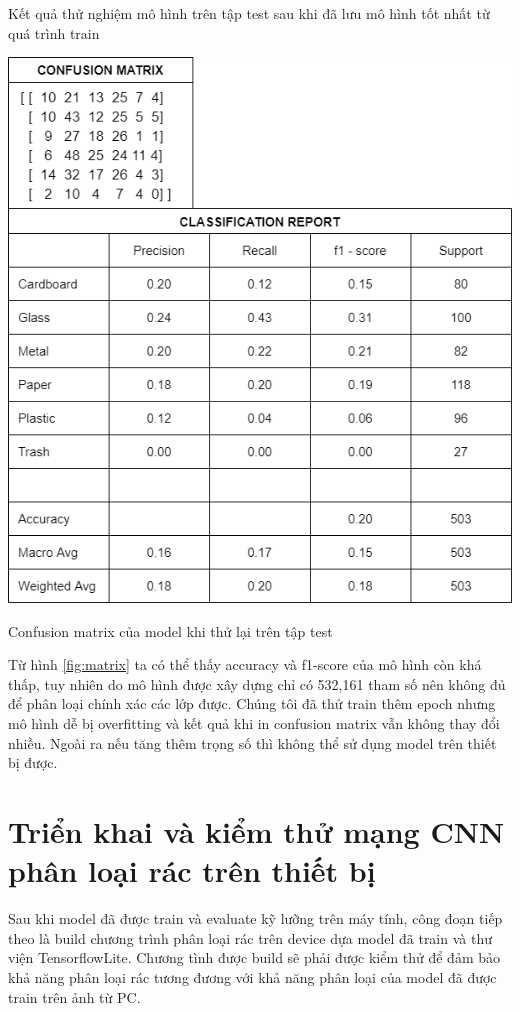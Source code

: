 Kết quả thử nghiệm mô hình trên tập test sau khi đã lưu mô hình tốt nhất từ quá trình train 
\begin{table}[H]
    \centering
    \includegraphics[width=\linewidth]{images/Quanh/matrix.png}
    \caption{Confusion matrix của model khi thử lại trên tập test}
    \label{fig:matrix}
\end{table}
Từ hình \ref{fig:matrix} ta có thể thấy accuracy và f1-score của mô hình còn khá thấp, tuy nhiên do mô hình được xây dựng chỉ có 532,161 tham số nên không đủ để phân loại chính xác các lớp được. Chúng tôi đã thử train thêm epoch nhưng mô hình dễ bị overfitting và kết quả khi in confusion matrix vẫn không thay đổi nhiều. Ngoài ra nếu tăng thêm trọng số thì không thể sử dụng model trên thiết bị được.


\section{Triển khai và kiểm thử mạng CNN phân loại rác trên thiết bị}
Sau khi model đã được train và evaluate kỹ lưỡng trên máy tính, công đoạn tiếp theo là build chương trình phân loại rác trên device dựa model đã train và thư viện TensorflowLite. 
Chương tình được build sẽ phải được kiểm thử để đảm bảo khả năng phân loại rác tương đương với khả năng phân loại của model đã được train trên ảnh từ PC.

